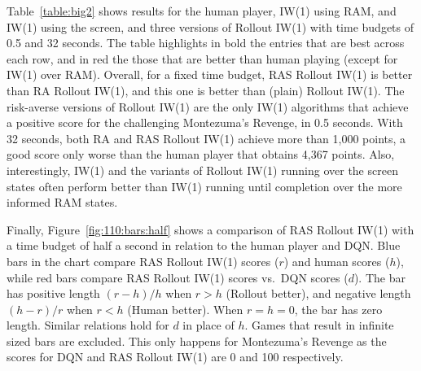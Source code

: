 \documentclass[letterpaper]{article}
\begin{document}
Table~\ref{table:big2} shows results for the human player, IW(1) using RAM, and
IW(1) using the screen, and three versions of Rollout IW(1) with time budgets
of 0.5 and 32 seconds. The table highlights in bold the entries that are best
across each row, and in red the those that are better than human playing (except
for IW(1) over RAM).
Overall, for a fixed time budget, RAS Rollout IW(1) is better than RA Rollout IW(1),
and this one is better than (plain) Rollout IW(1).
The risk-averse versions of Rollout IW(1) are the only IW(1) algorithms that
achieve a positive score for the challenging Montezuma's Revenge, in 0.5 seconds.
With 32 seconds, both RA and RAS Rollout IW(1) achieve more than 1,000 points,
a good score only worse than the human player that obtains 4,367 points.
Also, interestingly, IW(1) and the variants of Rollout IW(1) running over
the screen states often perform better than IW(1) running until completion over
the more informed RAM states.

Finally, Figure~\ref{fig:110:bars:half} shows a comparison of RAS Rollout IW(1)
with a time budget of half a second in relation to the human player and DQN.
Blue bars in the chart compare RAS Rollout IW(1) scores ($r$) and human scores
($h$), while red bars compare RAS Rollout IW(1) scores vs.\ DQN scores ($d$).
The bar has positive length $(r-h)/h$ when $r>h$ (Rollout better), and negative
length $(h-r)/r$ when $r<h$ (Human better).  When $r=h=0$, the bar has zero length.
Similar relations hold for $d$ in place of $h$.
Games that result in infinite sized bars are excluded. This only happens for
Montezuma's Revenge as the scores for DQN and RAS Rollout IW(1) are
0 and 100 respectively.
\end{document}

